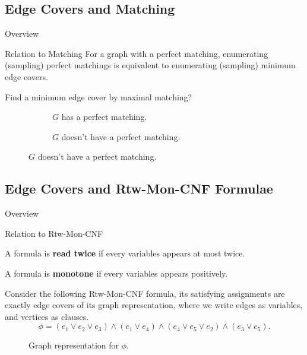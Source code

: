 \documentclass[mathserif]{beamer}
\begin{document}
\subsection{Edge Covers and Matching}
\begin{frame}{Overview}
	\tableofcontents[currentsubsection, hideothersubsections, sectionstyle=show/shaded, subsectionstyle=show/shaded]
\end{frame}
\begin{frame}{Relation to Matching}
For a graph with a perfect matching, enumerating (sampling) perfect matchings is equivalent to enumerating (sampling) minimum edge covers.
	\begin{example}
		Find a minimum edge cover by maximal matching?
		\begin{figure}[htp]
			\begin{subfigure}[b]{0.49\textwidth}
				\centering
				
				\caption{$G$ has a perfect matching.}
			\end{subfigure}
			\hfill
			\begin{subfigure}[b]{0.49\textwidth}
				\centering
				

				\caption{$G$ doesn't have a perfect matching.}
			\end{subfigure}
		\end{figure}
	\end{example}
\end{frame}

\subsection{Edge Covers and Rtw-Mon-CNF Formulae}
\begin{frame}{Overview}
	\tableofcontents[currentsubsection, hideothersubsections, sectionstyle=show/shaded, subsectionstyle=show/shaded]
\end{frame}

\begin{frame}{Relation to Rtw-Mon-CNF}
    \begin{definition}
        A formula is {\bf read twice} if every variables appears at most twice.

        A formula is {\bf monotone} if every variables appears positively.
    \end{definition}
    \pause
	Consider the following Rtw-Mon-CNF formula, its satisfying assignments are exactly edge covers of its graph representation, where we write edges as variables, and vertices as clauses.
	\[
		\phi = (e_1 \vee e_2 \vee e_3) \wedge (e_1 \vee e_4) \wedge (e_4 \vee e_5 \vee e_2 ) \wedge (e_3 \vee e_5).
	\]

	\begin{figure}[htp]
		\centering
		
		\caption{Graph representation for $\phi$.}
	\end{figure}
\end{frame}
\end{document}
